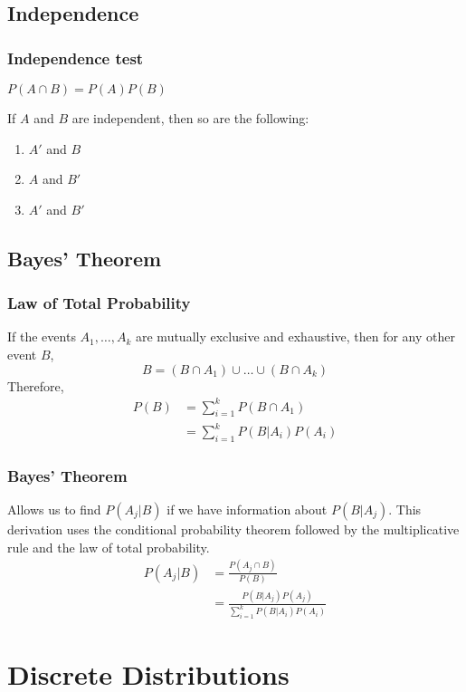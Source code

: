 \documentclass{article}
\begin{document}
\begin{multicols*}{2}
\subsection{Independence}

\subsubsection{Independence test}
$P(A \cap B) = P(A) P(B)$

If $A$ and $B$ are independent, then so are the following:
\begin{enumerate}
    \item $A'$ and $B$
    \item $A$ and $B'$
    \item $A'$ and $B'$
\end{enumerate}

\subsection{Bayes' Theorem}

\subsubsection{Law of Total Probability}
If the events $A_1, \ldots, A_k$ are mutually exclusive and exhaustive, then for any other event $B$,
\begin{equation*}
    B = (B \cap A_1) \cup \ldots \cup (B \cap A_k)
\end{equation*}
Therefore,
\begin{align*}
    P(B) &= \sum_{i = 1}^k P(B \cap A_1) \\
    &= \sum_{i = 1}^k P(B|A_i) P(A_i)
\end{align*}

\subsubsection{Bayes' Theorem}
Allows us to find $P(A_j|B)$ if we have information about $P(B|A_j)$. This derivation uses the conditional probability theorem followed by the multiplicative rule and the law of total probability.
\begin{align*}
    P(A_j|B) &= \frac{P(A_j \cap B)}{P(B)} \\
    &= \frac{P(B|A_j) P(A_j)}{\sum_{i = 1}^k P(B|A_i) P(A_i)}
\end{align*}

\section{Discrete Distributions}


\end{multicols*}
\end{document}
